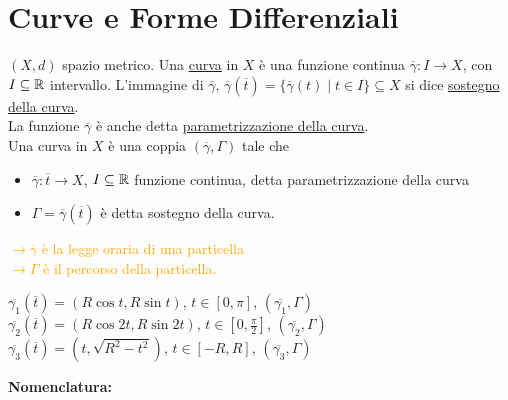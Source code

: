 \section{Curve e Forme Differenziali}

\begin{definition}
		$(X,d)$ spazio metrico. Una \underline{curva} in $X$ è una funzione continua $\overline{\gamma}:I \rightarrow X$, con $I \subseteq \mathbb{R}$ intervallo. L'immagine di $\overline{\gamma}$, $\overline{\gamma}(\overline{t})=\{\overline{\gamma}(t)\mid t \in I \}\subseteq X$ si dice \underline{sostegno della curva}.\\
	La funzione $\overline{\gamma}$ è anche detta \underline{parametrizzazione della curva}.\\
	Una curva in $X$ è una coppia $(\overline{\gamma},\Gamma)$ tale che
	\begin{itemize}
		\item $\overline{\gamma}:\overline{t}\rightarrow X$, $I \subseteq \mathbb{R}$ funzione continua, detta parametrizzazione della curva
		\item $\Gamma=\overline{\gamma}(\overline{t})$ è detta sostegno della curva.
	\end{itemize}
	\textcolor{orange}{$\rightarrow \overline{\gamma}$ è la legge oraria di una particella\\
		$\rightarrow \Gamma$ è il percorso della particella.}
\end{definition}


\begin{exbar}
	\segnaposto %
	
	$\overline{\gamma_1}(\overline{t})=(R\cos t , R\sin t)$, $t \in [0,\pi]$, $(\overline{\gamma_1},\Gamma)$\\
	$\overline{\gamma_2}(\overline{t})=(R\cos 2t, R\sin 2t)$, $t \in [0,\frac{\pi}{2}]$, $(\overline{\gamma_2},\Gamma)$\\
	$\overline{\gamma_3}(\overline{t})=(t, \sqrt{R^2-t^2})$, $t \in [-R,R]$, $(\overline{\gamma_3},\Gamma)$
\end{exbar}



\textbf{Nomenclatura:}

